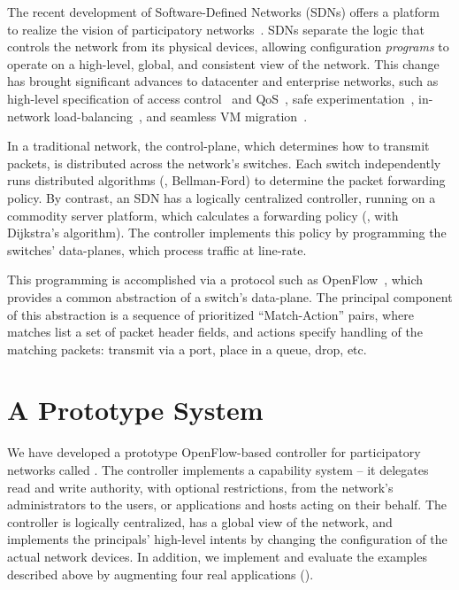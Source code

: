 The recent development of Software-Defined Networks (SDNs)
offers a platform to realize the vision of participatory networks~\cite{Greenberg:2005,McKeown:2008}.
SDNs separate
the logic that controls the network from its physical
devices, allowing configuration \emph{programs} to operate on a
high-level, global, and consistent view of the network. 
This change has brought significant advances to datacenter and
enterprise networks, such as high-level
specification of access control~\cite{Nayak:2009} and
QoS~\cite{Kim:2010}, safe experimentation~\cite{Sherwood:2010},
in-network load-balancing~\cite{wang11wild}, and seamless VM 
migration~\cite{Erickson:2008}.

In a traditional network, the control-plane, which determines how
to transmit packets, is distributed across the network's switches. Each
switch independently runs distributed algorithms (\eg, Bellman-Ford) to determine the
packet forwarding policy. By contrast, an SDN has a logically centralized
controller, running on a commodity server platform, which calculates
a forwarding policy (\eg, with Dijkstra's algorithm). The controller implements
this policy by programming the switches' data-planes, which process
traffic at line-rate.

This programming is accomplished via a protocol such as
OpenFlow~\cite{McKeown:2008}, which provides a common
abstraction of a switch's data-plane. The principal component of this
abstraction is a sequence of prioritized ``Match-Action'' pairs, where
matches list a set of packet header fields, and actions specify handling
of the matching packets: transmit via a port, place in a queue, drop, etc.

\section{A Prototype System}

We have developed a prototype OpenFlow-based controller
for participatory networks called \sys.
The \sys controller implements a capability system --
it delegates read and
write authority, with optional restrictions, from the network's
administrators to the users, or applications and hosts acting on
their behalf. The controller is logically centralized, has a global
view of the network, and implements the principals' high-level
intents by changing the configuration of the actual network devices.
In addition, we implement and evaluate the examples described
above by augmenting four real applications ().

